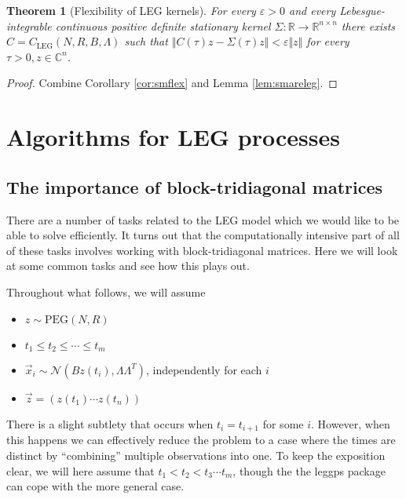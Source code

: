 \documentclass{article}
\newtheorem{theorem}{Theorem}
\theoremstyle{definition}
\newcommand{\LEG}{\mathrm{LEG}}
\newcommand{\PEGGP}{\mathrm{PEG}}
\begin{document}
\begin{theorem}[Flexibility of LEG kernels] \label{thm:legflex}
For every $\varepsilon>0$ and every Lebesgue-integrable continuous positive definite stationary kernel $\Sigma: \mathbb{R} \rightarrow \mathbb{R}^{n\times n}$ there exists $C=C_\LEG(N,R,B,\Lambda)$ such that $\Vert C(\tau)z -\Sigma(\tau)z \Vert < \varepsilon \Vert z \Vert$ for every $\tau>0,z\in\mathbb{C}^n$. 
\end{theorem}
\begin{proof}
Combine Corollary \ref{cor:smflex} and Lemma \ref{lem:smareleg}.
\end{proof}


                                                               

\section{Algorithms for LEG processes}

\subsection{The importance of block-tridiagonal matrices}

There are a number of tasks related to the LEG model which we would
like to be able to solve efficiently. It turns out that the computationally
intensive part of all of these tasks involves working with block-tridiagonal
matrices. Here we will look at some common tasks and see how this
plays out.

Throughout what follows, we will assume
\begin{itemize}
\item $z\sim\PEGGP(N,R)$
\item $t_{1}\leq t_{2} \leq \cdots \leq t_{m}$
\item $\vec x_i \sim \mathcal{N}\left(Bz(t_i),\Lambda\Lambda^{T}\right)$, independently for each $i$
\item $\vec{z}=(z(t_{1})\cdots z(t_{n}))$
\end{itemize}
There is a slight subtlety that occurs when $t_i=t_{i+1}$ for some $i$.  However, when this happens we can effectively reduce the problem to a case where the times are distinct by ``combining'' multiple observations into one.  To keep the exposition clear, we will here assume that $t_1 < t_2 <t_3 \cdots t_m$, though the the leggps package can cope with the more general case.
\end{document}
